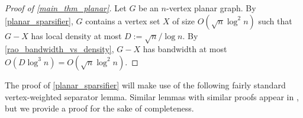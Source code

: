 \documentclass{patmorin}
\renewcommand{\ge}{\geqslant}
\renewcommand{\geq}{\geqslant}
\newcommand{\david}[1]{{\color{orange} David: #1}}
\newcommand{\pat}[1]{\textcolor{Blue}{Pat: #1}}
\begin{document}

\begin{proof}[Proof of \cref{main_thm_planar}]
  Let $G$ be an $n$-vertex planar graph.  By \cref{planar_sparsifier}, $G$ contains a vertex set $X$ of size $O(\sqrt{n}\log^2 n)$ such that $G-X$ has local density at most $D:=\sqrt{n}/\log n$.  By \cref{rao_bandwidth_vs_density}, $G-X$ has bandwidth at most $O(D\log^{3} n)=O(\sqrt{n}\log^2 n)$.
\end{proof}



The proof of \cref{planar_sparsifier} will make use of the following fairly standard vertex-weighted separator lemma.  Similar lemmas with similar proofs appear in  \citet{robertson.seymour:graph}, but we provide a proof for the sake of completeness.
\end{document}
